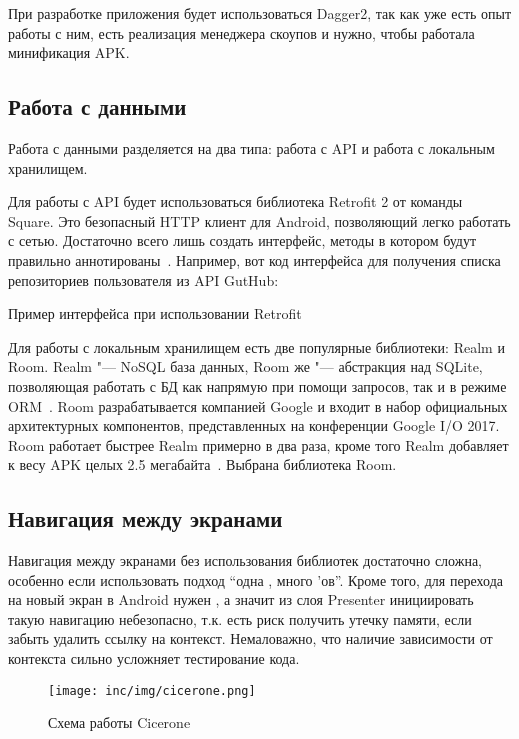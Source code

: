 При разработке приложения будет использоваться Dagger2, так как уже есть опыт работы с ним, есть реализация менеджера скоупов и нужно, чтобы работала минификация APK\@.

\subsection{Работа с данными}
\label{subsec:workWithData}
Работа с данными разделяется на два типа: работа с API и работа с локальным хранилищем.

Для работы с API будет использоваться библиотека Retrofit 2 от команды Square.
Это безопасный HTTP клиент для Android, позволяющий легко работать с сетью.
Достаточно всего лишь создать интерфейс, методы в котором будут правильно аннотированы~\cite{retrofit}.
Например, вот код интерфейса для получения списка репозиториев пользователя из API GutHub:

\begin{listing}[H]
  \caption{Пример интерфейса при использовании Retrofit}
  \label{lst:retrofitKt}
\end{listing}

Для работы с локальным хранилищем есть две популярные библиотеки: Realm и Room.
Realm "--- NoSQL база данных, Room же "--- абстракция над SQLite, позволяющая работать с БД как напрямую при помощи запросов, так и в режиме ORM~\cite{realm,android:room}.
Room разрабатывается компанией Google и входит в набор официальных архитектурных компонентов, представленных на конференции Google I/O 2017.
Room работает быстрее Realm примерно в два раза, кроме того Realm добавляет к весу APK целых 2.5 мегабайта~\cite{github:dbBench}.
Выбрана библиотека Room.

\subsection{Навигация между экранами}
\label{subsec:navigation}
Навигация между экранами без использования библиотек достаточно сложна, особенно если использовать подход ``одна , много 'ов''.
Кроме того, для перехода на новый экран в Android нужен , а значит из слоя Presenter инициировать такую навигацию небезопасно, т.к. есть риск получить утечку памяти, если забыть удалить ссылку на контекст.
Немаловажно, что наличие зависимости от контекста сильно усложняет тестирование кода.

\begin{figure}[ht]
  \texttt{[image: inc/img/cicerone.png]}
  \caption{Схема работы Cicerone}
  \label{fig:cicerone}
\end{figure}

